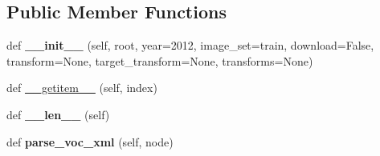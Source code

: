 \subsection*{Public Member Functions}
\begin{DoxyCompactItemize}
\item 
\mbox{\label{classtorchvision_1_1datasets_1_1voc_1_1VOCDetection_a2cd4ff0245632c72045fed682008a0b0}} 
def {\bfseries \+\_\+\+\_\+init\+\_\+\+\_\+} (self, root, year=\textquotesingle{}2012\textquotesingle{}, image\+\_\+set=\textquotesingle{}train\textquotesingle{}, download=False, transform=None, target\+\_\+transform=None, transforms=None)
\item 
def \hyperlink{classtorchvision_1_1datasets_1_1voc_1_1VOCDetection_ac4f9de50ff56feb893981db660d24e78}{\+\_\+\+\_\+getitem\+\_\+\+\_\+} (self, index)
\item 
\mbox{\label{classtorchvision_1_1datasets_1_1voc_1_1VOCDetection_ab3abebd70a76f0f23fba97d6f55e3f79}} 
def {\bfseries \+\_\+\+\_\+len\+\_\+\+\_\+} (self)
\item 
\mbox{\label{classtorchvision_1_1datasets_1_1voc_1_1VOCDetection_a3c6e5e960058816dc5b6797ff450fb77}} 
def {\bfseries parse\+\_\+voc\+\_\+xml} (self, node)
\end{DoxyCompactItemize}
